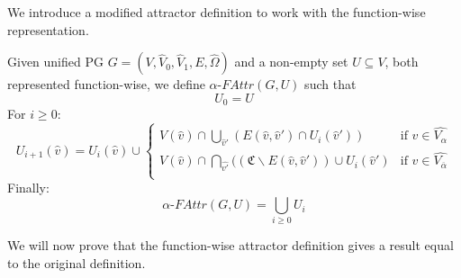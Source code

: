 We introduce a modified attractor definition to work with the function-wise representation.
\begin{definition}
		\label{def_Uattr}Given unified PG $G = (V, \hat{V}_0,\hat{V}_1,E,\hat{\Omega})$ and a non-empty set $U \subseteq V$, both represented function-wise, we define $\alpha\textit{-FAttr}(G,U)$ such that
	\[U_0 = U \]
	For $i \geq 0$:
	\[
	U_{i+1}(\hat{v}) = U_i(\hat{v}) \cup \begin{cases}
V(\hat{v}) \cap \bigcup_{\hat{v}'} (E(\hat{v},\hat{v}') \cap U_i(\hat{v}')) & \text{if } \hat{v} \in \hat{V_{\alpha}}\\
V(\hat{v}) \cap \bigcap_{\hat{v'}}((\mathfrak{C} \backslash E(\hat{v},\hat{v}')) \cup U_i(\hat{v}') & \text{if }\hat{v} \in  \hat{V_{\overline{\alpha}}} \\
	\end{cases}
	\]
	Finally:
	\[\alpha\textit{-FAttr}(G,U) = \bigcup_{i \geq 0} U_i \]
\end{definition}
We will now prove that the function-wise attractor definition gives a result equal to the original definition.
